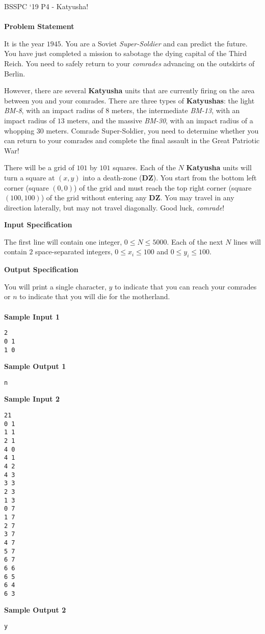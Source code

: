 \documentclass[]{article}
\begin{document}
{\Large BSSPC ‘19 P4 - Katyusha!}
\\\\
\textbf{\large Problem Statement}
\par
It is the year $1945$. You are a Soviet \textit{Super-Soldier} and can predict the future. You have just completed a mission to sabotage the dying capital of the Third Reich. You need to safely return to your \textit{comrades }advancing on the outskirts of Berlin.

\par
However, there are several \textbf{Katyusha} units that are currently firing on the area between you and your comrades. There are three types of \textbf{Katyushas}: the light \textit{BM-8}, with an impact radius of $8$ meters, the intermediate \textit{BM-13}, with an impact radius of $13$ meters, and the massive \textit{BM-30}, with an impact radius of a whopping $30$ meters. Comrade Super-Soldier, you need to determine whether you can return to your comrades and complete the final assault in the Great Patriotic War!

\par
There will be a grid of $101$ by $101$ squares. Each of the $N$ \textbf{Katyusha} units will turn a square at $(x,y)$ into a death-zone (\textbf{DZ}). You start from the bottom left corner (square $(0,0)$) of the grid and must reach the top right corner (square $(100,100)$) of the grid without entering any \textbf{DZ}. You may travel in any direction laterally, but may not travel diagonally. Good luck, \textit{comrade}!

\textbf{\large Input Specification}
\par
The first line will contain one integer, $0 \le N \le 5000$. Each of the next $N$ lines will contain $2$ space-separated integers, $0 \le x_i \le 100$ and $0 \le y_i \le 100$.

\textbf{\large Output Specification}
\par
You will print a single character, $y$ to indicate that you can reach your comrades or $n$ to indicate that you will die for the motherland.
\\\\
\textbf{\large Sample Input 1}
\begin{verbatim}
2
0 1
1 0
\end{verbatim}
\textbf{\large Sample Output 1}
\begin{verbatim}
n
\end{verbatim}

\textbf{\large Sample Input 2}
\begin{verbatim}
21
0 1
1 1
2 1
4 0
4 1
4 2
4 3
3 3
2 3
1 3
0 7
1 7
2 7
3 7
4 7
5 7
6 7
6 6
6 5
6 4
6 3
\end{verbatim}
\textbf{\large Sample Output 2}
\begin{verbatim}
y
\end{verbatim}

\thispagestyle{empty}
\end{document}

